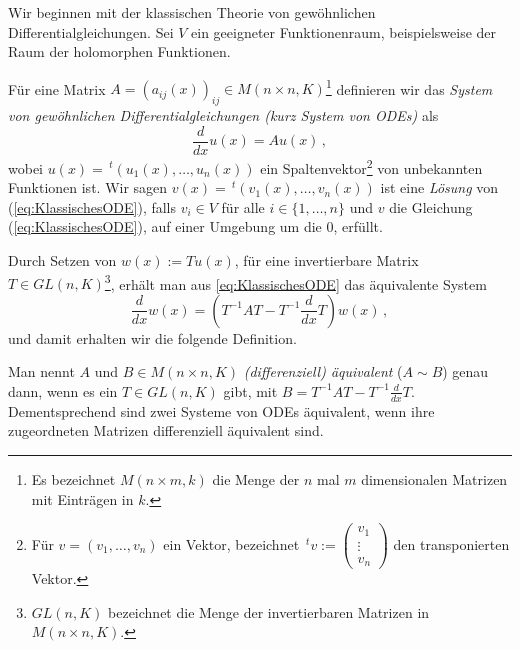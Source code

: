 \begin{comment}
\cite[Chap 5.1.1]{hotta2007d} %
\end{comment}
Wir beginnen mit der klassischen Theorie von gewöhnlichen
Differentialgleichungen.
Sei $V$ ein geeigneter Funktionenraum, beispielsweise der Raum der holomorphen
Funktionen.
\begin{defn}
Für eine Matrix $A=(a_{ij}(x))_{ij}\in M(n\times n,K)$\footnote{
Es bezeichnet $M(n\times m,k)$ die Menge der $n$ mal
$m$ dimensionalen Matrizen mit Einträgen in $k$.
}
definieren wir das
\emph{System von gewöhnlichen Differentialgleichungen (kurz System von ODEs)}
als
\begin{equation}
\label{eq:KlassischesODE}
\frac{d}{dx}u(x)=Au(x) \,,
\end{equation}
wobei $u(x)=\,^t(u_1(x),\dots,u_n(x))$ ein
Spaltenvektor\footnote{Für $v=(v_1,\dots,v_n)$ ein Vektor, bezeichnet
$ \,^tv:= \begin{pmatrix} v_{1}\\ \vdots\\ v_{n} \end{pmatrix} $
den transponierten Vektor.} von unbekannten Funktionen ist.
Wir sagen $v(x)=\,^t(v_1(x),\dots,v_n(x))$ ist eine \emph{Lösung} von
(\ref{eq:KlassischesODE}), falls $ v_i\in V$ für alle
$i\in\{1,\dots,n\}$ und $v$ die Gleichung (\ref{eq:KlassischesODE}), auf einer
Umgebung um die $0$, erfüllt.
\end{defn}

Durch Setzen von $w(x):=Tu(x)$, für eine invertierbare Matrix $T\in
GL(n,K)$\footnote{$GL(n,K)$ bezeichnet die Menge der invertierbaren Matrizen in
$M(n\times n,K)$.},
erhält man aus \ref{eq:KlassischesODE} das äquivalente System
\[
\frac{d}{dx}w(x)=(T^{-1}AT - T^{-1}\frac{d}{dx}T)w(x) \,,
\]
und damit erhalten wir die folgende Definition.
\begin{defn}
Man nennt $A$ und $B\in M(n\times n,K)$ \emph{(differenziell) äquivalent}
($A\sim B$) genau dann, wenn es ein $T\in GL(n,K)$ gibt, mit
$B=T^{-1}AT-T^{-1}\frac{d}{dx}T$.
Dementsprechend sind zwei Systeme von ODEs äquivalent, wenn ihre zugeordneten
Matrizen differenziell äquivalent sind.
\end{defn}

\begin{comment}
$1=TT^{-1}$ $\rightsquigarrow$ $T'T^{-1}+T(T^{-1})'=0$\\
$1=T^{-1}T$ $\rightsquigarrow$ $(T^{-1})'T+T^{-1}T'=0$
\end{comment}

